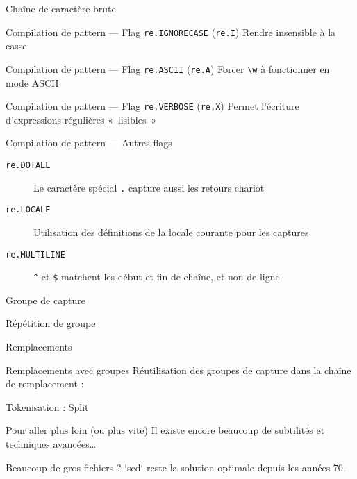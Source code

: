 \begin{frame}{Chaîne de caractère brute}
\end{frame}

\begin{frame}{Compilation de pattern --- Flag \texttt{re.IGNORECASE} (\texttt{re.I})}
  Rendre insensible à la casse
\end{frame}

\begin{frame}{Compilation de pattern --- Flag \texttt{re.ASCII} (\texttt{re.A})}
  Forcer \texttt{\textbackslash w} à fonctionner en mode ASCII
\end{frame}

\begin{frame}{Compilation de pattern --- Flag \texttt{re.VERBOSE} (\texttt{re.X})}
  Permet l'écriture d'expressions régulières «~lisibles~»
\end{frame}

\begin{frame}{Compilation de pattern --- Autres flags}
  \begin{description}
  \item[\texttt{re.DOTALL}] Le caractère spécial \texttt{.} capture aussi les retours chariot
  \item[\texttt{re.LOCALE}] Utilisation des définitions de la locale courante pour les captures
  \item[\texttt{re.MULTILINE}] \texttt{\^{}} et \texttt{\$} matchent les début et fin de chaîne, et non de ligne
  \end{description}
\end{frame}

\begin{frame}{Groupe de capture}
\end{frame}

\begin{frame}{Répétition de groupe}
\end{frame}

\begin{frame}{Remplacements}
\end{frame}

\begin{frame}{Remplacements avec groupes}
  Réutilisation des groupes de capture dans la chaîne de remplacement :
\end{frame}

\begin{frame}{Tokenisation : Split}
\end{frame}

\begin{frame}{Pour aller plus loin (ou plus vite)}
  Il existe encore beaucoup de subtilités et techniques avancées…

  Beaucoup de gros fichiers ? `sed` reste la solution optimale depuis les années 70.
\end{frame}

